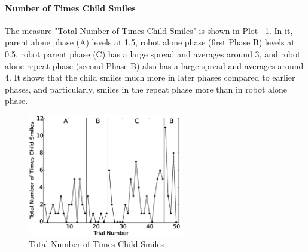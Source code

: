 \paragraph{Number of Times Child Smiles}
The measure "Total Number of Times Child Smiles" is shown in Plot \ \ref{fig:12TotalNumberofTimesChildSmiles}.  In it, parent alone phase (A) levels at 1.5, robot alone phase (first Phase B) levels at 0.5, robot parent phase (C) has a large spread and averages around 3, and robot alone repeat phase (second Phase B) also has a large spread and averages around 4.  It shows that the child smiles much more in later phases compared to earlier phases, and particularly, smiles in the repeat phase more than in robot alone phase.
\begin{figure} [h]
	\centering
	\includegraphics[width=0.6\textwidth]{./img/data_analysis/12TotalNumberofTimesChildSmiles.eps}
	\caption{Total Number of Times Child Smiles}
	\label{fig:12TotalNumberofTimesChildSmiles}
\end{figure}



